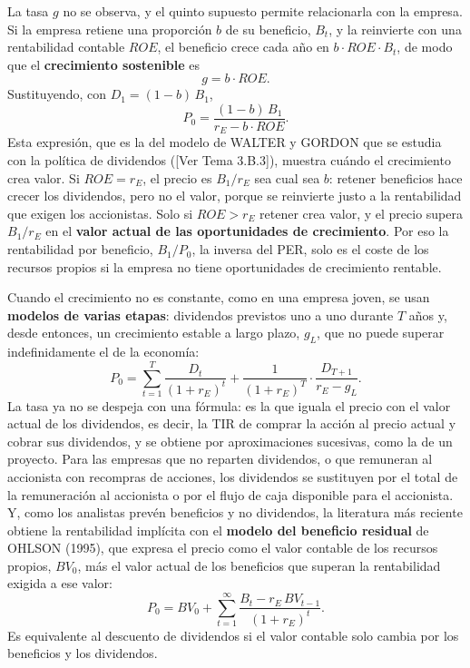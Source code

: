 \documentclass[10pt,a4paper]{article}
\newcommand{\authorfont}[1]{{\fontfamily{EBGaramond-TLF}\selectfont #1}}
\begin{document}
La tasa $g$ no se observa, y el quinto supuesto permite relacionarla con la empresa. Si la empresa retiene una proporción $b$ de su beneficio, $B_t$, y la reinvierte con una rentabilidad contable $ROE$, el beneficio crece cada año en $b\cdot ROE\cdot B_t$, de modo que el \textbf{crecimiento sostenible} es
$$g=b\cdot ROE.$$
Sustituyendo, con $D_1=(1-b)\,B_1$,
$$P_0=\frac{(1-b)\,B_1}{r_E-b\cdot ROE}.$$
Esta expresión, que es la del modelo de WALTER y GORDON que se estudia con la política de dividendos ([\authorfont{Ver Tema 3.B.3}]), muestra cuándo el crecimiento crea valor. Si $ROE=r_E$, el precio es $B_1/r_E$ sea cual sea $b$: retener beneficios hace crecer los dividendos, pero no el valor, porque se reinvierte justo a la rentabilidad que exigen los accionistas. Solo si $ROE>r_E$ retener crea valor, y el precio supera $B_1/r_E$ en el \textbf{valor actual de las oportunidades de crecimiento}. Por eso la rentabilidad por beneficio, $B_1/P_0$, la inversa del PER, solo es el coste de los recursos propios si la empresa no tiene oportunidades de crecimiento rentable.

Cuando el crecimiento no es constante, como en una empresa joven, se usan \textbf{modelos de varias etapas}: dividendos previstos uno a uno durante $T$ años y, desde entonces, un crecimiento estable a largo plazo, $g_L$, que no puede superar indefinidamente el de la economía:
$$P_0=\sum_{t=1}^{T}\frac{D_t}{(1+r_E)^t}+\frac{1}{(1+r_E)^T}\cdot\frac{D_{T+1}}{r_E-g_L}.$$
La tasa ya no se despeja con una fórmula: es la que iguala el precio con el valor actual de los dividendos, es decir, la TIR de comprar la acción al precio actual y cobrar sus dividendos, y se obtiene por aproximaciones sucesivas, como la de un proyecto. Para las empresas que no reparten dividendos, o que remuneran al accionista con recompras de acciones, los dividendos se sustituyen por el total de la remuneración al accionista o por el flujo de caja disponible para el accionista. Y, como los analistas prevén beneficios y no dividendos, la literatura más reciente obtiene la rentabilidad implícita con el \textbf{modelo del beneficio residual} de OHLSON (1995), que expresa el precio como el valor contable de los recursos propios, $BV_0$, más el valor actual de los beneficios que superan la rentabilidad exigida a ese valor:
$$P_0=BV_0+\sum_{t=1}^{\infty}\frac{B_t-r_E\,BV_{t-1}}{(1+r_E)^t}.$$
Es equivalente al descuento de dividendos si el valor contable solo cambia por los beneficios y los dividendos.
\end{document}
